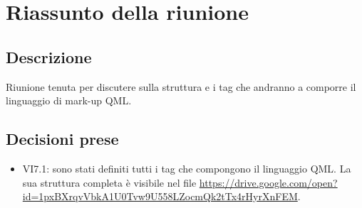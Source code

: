 \section{Riassunto della riunione}
\subsection{Descrizione}

Riunione tenuta per discutere sulla struttura e i tag che andranno a comporre il linguaggio di mark-up QML.

\subsection{Decisioni prese}
\begin{itemize}
\item VI7.1: sono stati definiti tutti i tag che compongono il linguaggio QML. La sua struttura completa è visibile nel file \url{https://drive.google.com/open?id=1pxBXrqvVbkA1U0Tvw9U558LZocmQk2tTx4rHyrXnFEM}.
\end{itemize}
